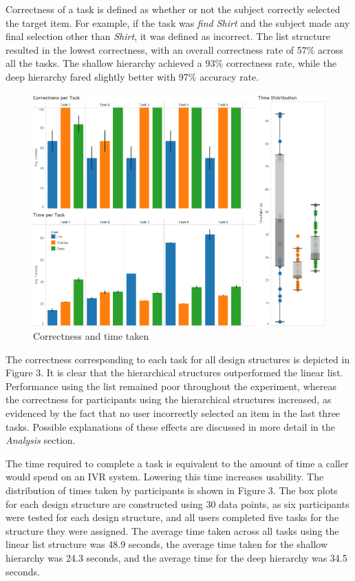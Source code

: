 \documentclass{sigchi}
\begin{document}
Correctness of a task is defined as whether or not the subject correctly selected the target item. For example, if the task was \textit{find Shirt} and the subject made any final selection other than \textit{Shirt}, it was defined as incorrect. The list structure resulted in the lowest correctness, with an overall correctness rate of 57\% across all the tasks. The shallow hierarchy achieved a 93\% correctness rate, while the deep hierarchy fared slightly better with 97\% accuracy rate.

\begin{figure}[!h]
    \centering
    \includegraphics[width=0.9\columnwidth]{fig_CorrectnessAndTime}
    \caption{Correctness and time taken}
    \label{fig: Figure3}
\end{figure}

The correctness corresponding to each task for all design structures is depicted in Figure 3. It is clear that the hierarchical structures outperformed the linear list. Performance using the list remained poor throughout the experiment, whereas the correctness for participants using the hierarchical structures increased, as evidenced by the fact that no user incorrectly selected an item in the last three tasks. Possible explanations of these effects are discussed in more detail in the \textit{Analysis} section.

The time required to complete a task is equivalent to the amount of time a caller would spend on an IVR system. Lowering this time increases usability. The distribution of times taken by participants is shown in Figure 3. The box plots for each design structure are constructed using 30 data points, as six participants were tested for each design structure, and all users completed five tasks for the structure they were assigned. The average time taken across all tasks using the linear list structure was 48.9 seconds, the average time taken for the shallow hierarchy was 24.3 seconds, and the average time for the deep hierarchy was 34.5 seconds.
\end{document}
